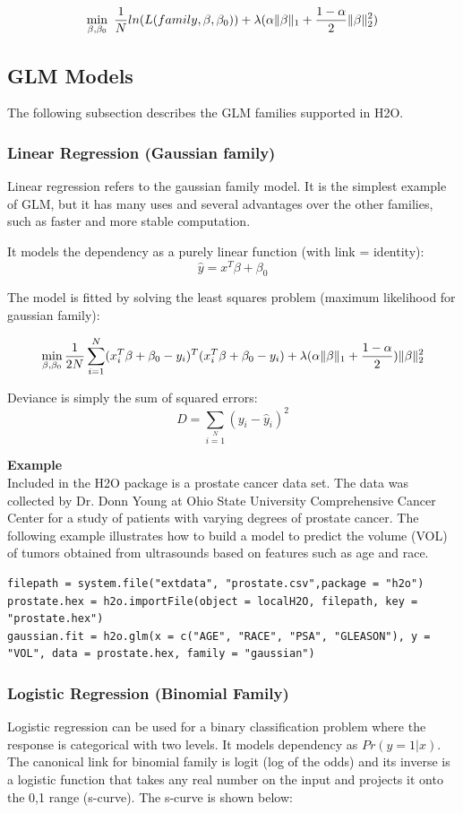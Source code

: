 \[ \min\limits_{\beta,\beta_0}\ {{1\over{N}} ln(L(family,\beta,\beta_0))  + \lambda (\alpha \| \beta \|_1}  + {1- \alpha \over 2} \| \beta \|_2^2) \]


\subsection{GLM Models} 
The following subsection describes the GLM families supported in H2O. 

\subsubsection{Linear Regression (Gaussian family) }
Linear regression refers to the gaussian family model. It is the simplest example of GLM, but it has many uses and several advantages over the other families, such as faster and more stable computation. 

It models the dependency as a purely linear function (with link = identity):
\[ \hat{y} = x^T\beta + \beta_0\]

The model is fitted by solving the least squares problem (maximum likelihood for gaussian family):

\[ \min\limits_{\beta,\beta_0} { {1 \over 2N}\sum\limits_{i=1}\limits^{N}(x_i^{T}\beta  + \beta_0- y_i)^T (x_i^{T}\beta + \beta_0 - y_i)  + \lambda (\alpha \|\beta \|_1 + {1-\alpha \over 2}) \| \beta \|_2^2} \]


Deviance is simply the sum of squared errors:
\[ D = \sum\limits_{i=1}\limits^{N}{(y_i - \hat{y}_i)^2} \]


\textbf{Example}\\

Included in the H2O package is a prostate cancer data set. The data was collected by Dr. Donn Young at  Ohio State University Comprehensive Cancer Center for a study of patients with varying degrees of prostate cancer. The following example illustrates how to build a model to predict the volume (VOL) of tumors obtained from ultrasounds based on features such as age and race.

\begin{lstlisting}[style=R]
filepath = system.file("extdata", "prostate.csv",package = "h2o")
prostate.hex = h2o.importFile(object = localH2O, filepath, key = "prostate.hex")
gaussian.fit = h2o.glm(x = c("AGE", "RACE", "PSA", "GLEASON"), y = "VOL", data = prostate.hex, family = "gaussian")
\end{lstlisting}

\subsubsection{Logistic Regression (Binomial Family)}
Logistic regression can be used for a binary classification problem where the response is categorical with two levels. It models dependency as $Pr(y = 1|x)$. The canonical link for binomial family is logit (log of the odds) and its inverse is a logistic function that takes any real number on the input and projects it onto the 0,1 range (s-curve).  The s-curve is shown below: 

